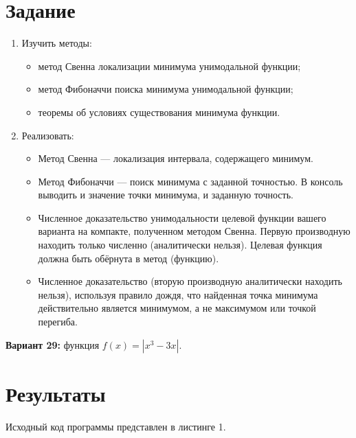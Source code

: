 \documentclass[a4paper, 14pt]{extarticle}
\begin{document}
\section{Задание}\label{Sect::task}
\begin{enumerate}
\item Изучить методы:
\begin{itemize}
\item метод Свенна локализации минимума унимодальной функции;
\item метод Фибоначчи поиска минимума унимодальной функции;
\item теоремы об условиях существования минимума функции.
\end{itemize}

\item Реализовать:
\begin{itemize}
\item Метод Свенна — локализация интервала, содержащего минимум.

\item Метод Фибоначчи — поиск минимума с заданной точностью. В консоль выводить и значение точки минимума, и заданную точность.

\item Численное доказательство унимодальности целевой функции вашего варианта на компакте, полученном методом Свенна. Первую производную находить только численно (аналитически нельзя). Целевая функция должна быть обёрнута в метод (функцию).

\item Численное доказательство (вторую производную аналитически находить нельзя), используя правило дождя, что найденная точка минимума действительно является минимумом, а не максимумом или точкой перегиба.
\end{itemize}
\end{enumerate}

\textbf{Вариант 29:} функция $f(x) = |x^3-3x|$.

\section{Результаты}\label{Sect::res}

Исходный код программы представлен в листинге 1.
\end{document}
